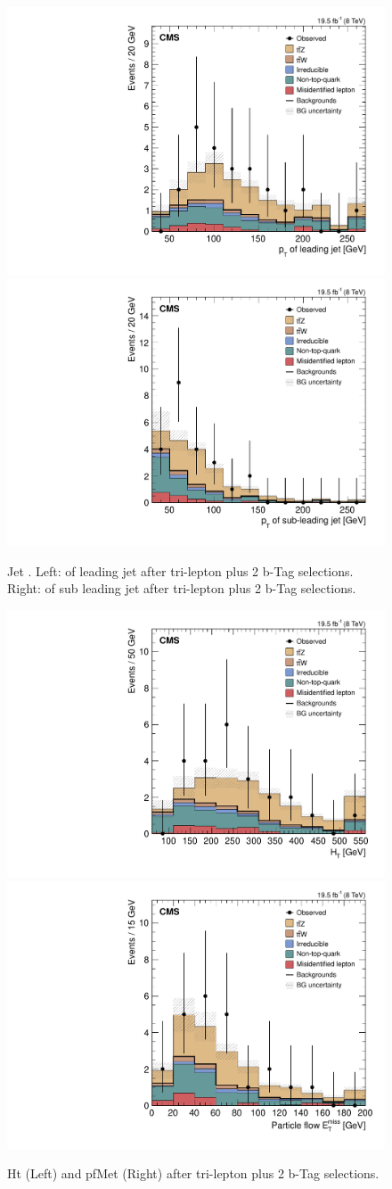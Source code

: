 \begin{figure}[h]
\begin{center}
\includegraphics[width=0.48\linewidth]{Figs/Plots_PreSelections/hJ1Pt_3L2b.pdf}
\includegraphics[width=0.48\linewidth]{Figs/Plots_PreSelections/hJ2Pt_3L2b.pdf}
\caption{\label{fig:JPt_3L2b}
Jet \pt . Left: \pt of leading jet after tri-lepton plus 2 b-Tag selections. Right: \pt of sub leading jet after tri-lepton plus 2 b-Tag selections.
}
\end{center}
\end{figure}

\begin{figure}[h]
\begin{center}
\includegraphics[width=0.48\linewidth]{Figs/Plots_PreSelections/hHt_3L2b.pdf}
\includegraphics[width=0.48\linewidth]{Figs/Plots_PreSelections/hPFMet_3L2b.pdf}
\caption{\label{fig:hht_pfmet_3l}
Ht (Left) and pfMet (Right) after tri-lepton plus 2 b-Tag selections.
}
\end{center}
\end{figure}







